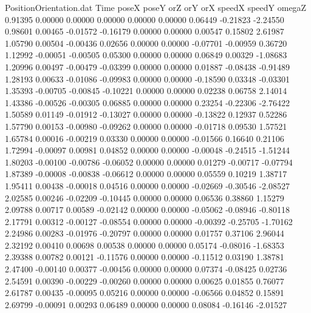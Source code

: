 \begin{filecontents}{PositionOrientation.dat}
Time poseX poseY orZ orY orX speedX speedY omegaZ
   0.91395    0.00000    0.00000     0.00000    0.00000    0.00000    0.06449   -0.21823   -2.24550
   0.98601    0.00465   -0.01572    -0.16179    0.00000    0.00000    0.00547    0.15802    2.61987
   1.05790    0.00504   -0.00436     0.02656    0.00000    0.00000   -0.07701   -0.00959    0.36720
   1.12992   -0.00051   -0.00505     0.05300    0.00000    0.00000    0.06849    0.00329   -1.08683
   1.20996    0.00497   -0.00479    -0.03399    0.00000    0.00000    0.01887   -0.08438   -0.91489
   1.28193    0.00633   -0.01086    -0.09983    0.00000    0.00000   -0.18590    0.03348   -0.03301
   1.35393   -0.00705   -0.00845    -0.10221    0.00000    0.00000    0.02238    0.06758    2.14014
   1.43386   -0.00526   -0.00305     0.06885    0.00000    0.00000    0.23254   -0.22306   -2.76422
   1.50589    0.01149   -0.01912    -0.13027    0.00000    0.00000   -0.13822    0.12937    0.52286
   1.57790    0.00153   -0.00980    -0.09262    0.00000    0.00000   -0.01718    0.09530    1.57521
   1.65784    0.00016   -0.00219     0.03330    0.00000    0.00000   -0.01566    0.16640    0.21106
   1.72994   -0.00097    0.00981     0.04852    0.00000    0.00000   -0.00048   -0.24515   -1.51244
   1.80203   -0.00100   -0.00786    -0.06052    0.00000    0.00000    0.01279   -0.00717   -0.07794
   1.87389   -0.00008   -0.00838    -0.06612    0.00000    0.00000    0.05559    0.10219    1.38717
   1.95411    0.00438   -0.00018     0.04516    0.00000    0.00000   -0.02669   -0.30546   -2.08527
   2.02585    0.00246   -0.02209    -0.10445    0.00000    0.00000    0.06536    0.38860    1.15279
   2.09788    0.00717    0.00589    -0.02142    0.00000    0.00000   -0.05062   -0.08946   -0.80118
   2.17791    0.00312   -0.00127    -0.08554    0.00000    0.00000   -0.00392   -0.25705   -1.70162
   2.24986    0.00283   -0.01976    -0.20797    0.00000    0.00000    0.01757    0.37106    2.96044
   2.32192    0.00410    0.00698     0.00538    0.00000    0.00000    0.05174   -0.08016   -1.68353
   2.39388    0.00782    0.00121    -0.11576    0.00000    0.00000   -0.11512    0.03190    1.38781
   2.47400   -0.00140    0.00377    -0.00456    0.00000    0.00000    0.07374   -0.08425    0.02736
   2.54591    0.00390   -0.00229    -0.00260    0.00000    0.00000    0.00625    0.01855    0.76077
   2.61787    0.00435   -0.00095     0.05216    0.00000    0.00000   -0.06566    0.04852    0.15891
   2.69799   -0.00091    0.00293     0.06489    0.00000    0.00000    0.08084   -0.16146   -2.01527

\end{filecontents}

